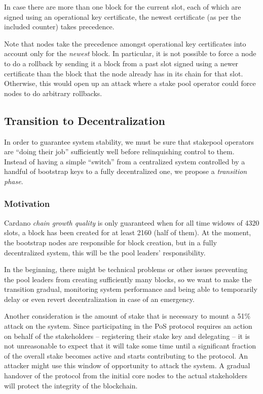\documentclass[11pt,a4paper]{article}
\begin{document}
In case there are more than one block for the current slot, each of
which are signed using an operational key certificate, the newest certificate
(as per the included counter) takes precedence.

Note that nodes take the precedence amongst operational key certificates
into account only for the \emph{newest} block. In particular, it is
not possible to force a node to do a rollback by sending it a block
from a past slot signed using a newer certificate than the block that
the node already has in its chain for that slot. Otherwise, this would
open up an attack where a stake pool operator could force nodes to do
arbitrary rollbacks.

\subsection{Transition to Decentralization}
\label{transition-to-decentralization}

In order to guarantee system stability, we must be sure that stakepool
operators are ``doing their job'' sufficiently well before relinquishing
control to them. Instead of having a simple ``switch'' from a
centralized system controlled by a handful of bootstrap keys to a fully
decentralized one, we propose a \emph{transition phase}.

\subsubsection{Motivation}
\label{motivation}

Cardano \emph{chain growth quality} is only guaranteed when for all time
widows of 4320 slots, a block has been created for at least 2160 (half
of them). At the moment, the bootstrap nodes are responsible for block
creation, but in a fully decentralized system, this will be the pool
leaders' responsibility.

In the beginning, there might be technical problems or other issues
preventing the pool leaders from creating sufficiently many blocks, so
we want to make the transition gradual, monitoring system performance
and being able to temporarily delay or even revert decentralization in
case of an emergency.

Another consideration is the amount of stake that is necessary to mount
a 51\% attack on the system. Since participating in the PoS protocol
requires an action on behalf of the stakeholders -- registering their
stake key and delegating -- it is not unreasonable to expect that it
will take some time until a significant fraction of the overall stake
becomes active and starts contributing to the protocol. An attacker
might use this window of opportunity to attack the system. A gradual
handover of the protocol from the initial core nodes to the actual
stakeholders will protect the integrity of the blockchain.
\end{document}
